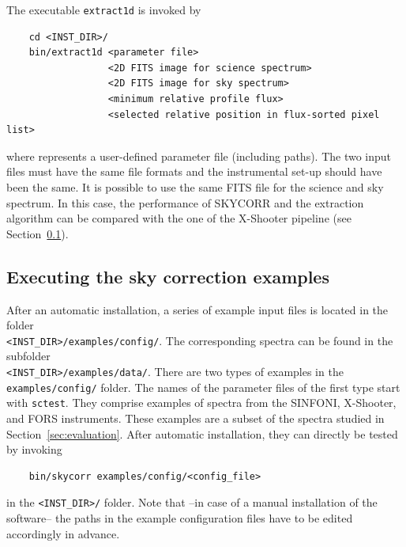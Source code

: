 The executable {\tt extract1d} is invoked by
\begin{verbatim}
    cd <INST_DIR>/
    bin/extract1d <parameter file>
                  <2D FITS image for science spectrum>
                  <2D FITS image for sky spectrum>
                  <minimum relative profile flux>
                  <selected relative position in flux-sorted pixel list>
\end{verbatim}
where {\tt <parameter file>} represents a user-defined parameter file
(including paths). The two input files must have the same file formats and
the instrumental set-up should have been the same. It is possible to use the
same FITS file for the science and sky spectrum. In this case, the performance
of SKYCORR and the extraction algorithm can be compared with the one of the
X-Shooter pipeline (see Section~\ref{sec:calling_examples}).

\subsection{Executing the sky correction examples}\label{sec:calling_examples}
After an automatic installation, a series of example input files is located in
the folder \\{\tt <INST\_DIR>/examples/config/}.
The corresponding spectra can be found in the subfolder \\
{\tt <INST\_DIR>/examples/data/}. There are two types of examples in the
{\tt examples/config/} folder.
The names of the parameter files of the first type start with {\tt sctest}.
They comprise examples of spectra from the SINFONI, X-Shooter,
and FORS instruments. These examples are a subset of the spectra studied in
Section~\ref{sec:evaluation}. After automatic installation, they can directly
be tested by invoking
\begin{verbatim}
    bin/skycorr examples/config/<config_file>
\end{verbatim}
in the {\tt <INST\_DIR>/} folder. Note that --in case of a manual
installation of the software-- the paths in the example configuration files
have to be edited accordingly in advance.

